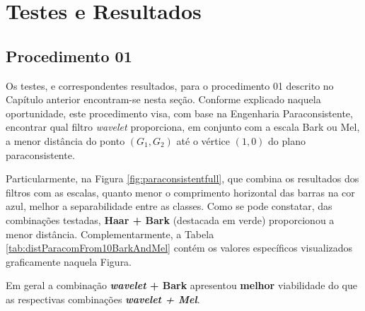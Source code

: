 \chapter{Testes e Resultados} \label{chap:testsResults}
	\section{Procedimento 01}
	\label{chap:testsResults:sec:Experimento01}
	Os testes, e correspondentes resultados, para o procedimento 01 descrito no Capítulo anterior encontram-se nesta seção. Conforme explicado naquela oportunidade, este procedimento visa, com base na Engenharia Paraconsistente, encontrar qual filtro \textit{wavelet} proporciona, em conjunto com a escala Bark ou Mel, a menor distância do ponto $(G_1,G_2)$ até o vértice $(1,0)$ do plano paraconsistente.

	\par Particularmente, na Figura \ref{fig:paraconsistentfull}, que combina os resultados dos filtros com as escalas, quanto menor o comprimento horizontal das barras na cor azul, melhor a separabilidade entre as classes. Como se pode constatar, das combinações testadas, \textbf{Haar + Bark} (destacada em verde) proporcionou a menor distância. Complementarmente, a Tabela \ref{tab:distParacomFrom10BarkAndMel} contém os valores específicos visualizados graficamente naquela Figura.
	
	\par Em geral a combinação \textbf{\textit{wavelet} + Bark} apresentou \textbf{melhor} viabilidade do que as respectivas combinações \textbf{\textit{wavelet + Mel}}.\\

	
	
